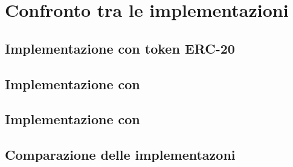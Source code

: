 \chapter{Confronto tra le implementazioni}
\section{Implementazione con token ERC-20}
\section{Implementazione con }
\section{Implementazione con}
\section{Comparazione delle implementazoni}
